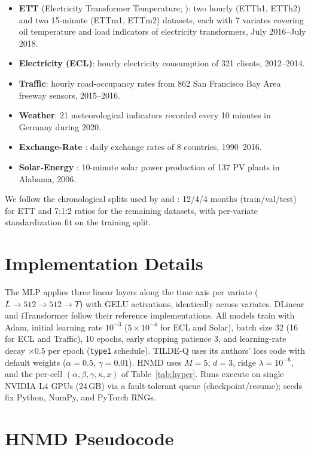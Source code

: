 \documentclass[11pt,twocolumn]{article}
\newcommand{\methodName}{HNMD\xspace}
\begin{document}
\begin{itemize}
    \item \textbf{ETT} (Electricity Transformer Temperature; \citealp{informer}): two hourly (ETTh1, ETTh2) and two 15-minute (ETTm1, ETTm2) datasets, each with 7 variates covering oil temperature and load indicators of electricity transformers, July 2016--July 2018.
    \item \textbf{Electricity (ECL)}: hourly electricity consumption of 321 clients, 2012--2014.
    \item \textbf{Traffic}: hourly road-occupancy rates from 862 San Francisco Bay Area freeway sensors, 2015--2016.
    \item \textbf{Weather}: 21 meteorological indicators recorded every 10 minutes in Germany during 2020.
    \item \textbf{Exchange-Rate} \citep{lai2018modeling}: daily exchange rates of 8 countries, 1990--2016.
    \item \textbf{Solar-Energy} \citep{lai2018modeling}: 10-minute solar power production of 137 PV plants in Alabama, 2006.
\end{itemize}
We follow the chronological splits used by \citet{autoformer} and \citet{itransformer}: 12/4/4 months (train/val/test) for ETT and 7:1:2 ratios for the remaining datasets, with per-variate standardization fit on the training split.

\section{Implementation Details}
\label{app:impl}

The MLP applies three linear layers along the time axis per variate ($L \to 512 \to 512 \to T$) with GELU activations, identically across variates. DLinear and iTransformer follow their reference implementations. All models train with Adam, initial learning rate $10^{-3}$ ($5\times10^{-4}$ for ECL and Solar), batch size 32 (16 for ECL and Traffic), 10 epochs, early stopping patience 3, and learning-rate decay $\times 0.5$ per epoch (\texttt{type1} schedule). TILDE-Q uses its authors' loss code with default weights ($\alpha{=}0.5$, $\gamma{=}0.01$). \methodName uses $M{=}5$, $d{=}3$, ridge $\lambda{=}10^{-6}$, and the per-cell $(\alpha,\beta,\gamma,\kappa,x)$ of Table~\ref{tab:hyper}. Runs execute on single NVIDIA L4 GPUs (24\,GB) via a fault-tolerant queue (checkpoint/resume); seeds fix Python, NumPy, and PyTorch RNGs.

\section{HNMD Pseudocode}
\label{app:algo}
\end{document}
